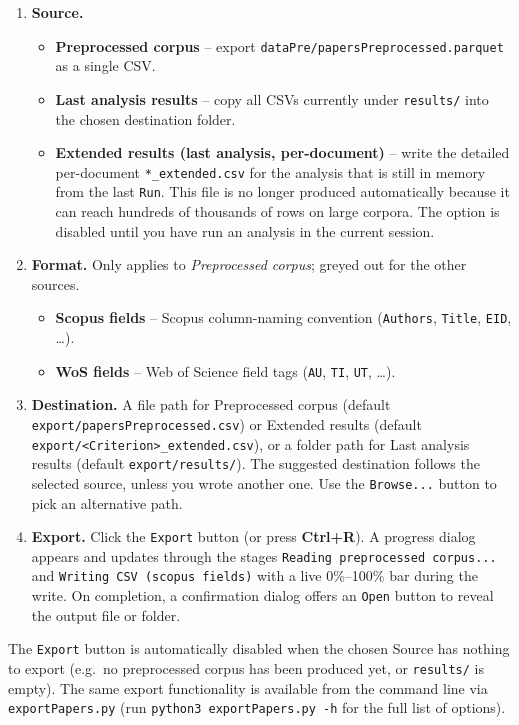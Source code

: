 \documentclass[10pt,letterpaper]{article}
\begin{document}
\begin{enumerate}
\item \textbf{Source.}
	\begin{itemize}
	\item \textbf{Preprocessed corpus} -- export \verb|dataPre/papersPreprocessed.parquet| as a single CSV.
	\item \textbf{Last analysis results} -- copy all CSVs currently under \verb|results/| into the chosen destination folder.
	\item \textbf{Extended results (last analysis, per-document)} -- write the detailed per-document \verb|*_extended.csv| for the analysis that is still in memory from the last \verb|Run|. This file is no longer produced automatically because it can reach hundreds of thousands of rows on large corpora. The option is disabled until you have run an analysis in the current session.
	\end{itemize}
\item \textbf{Format.} Only applies to \emph{Preprocessed corpus}; greyed out for the other sources.
	\begin{itemize}
	\item \textbf{Scopus fields} -- Scopus column-naming convention (\verb|Authors|, \verb|Title|, \verb|EID|, \ldots).
	\item \textbf{WoS fields} -- Web of Science field tags (\verb|AU|, \verb|TI|, \verb|UT|, \ldots).
	\end{itemize}
\item \textbf{Destination.} A file path for Preprocessed corpus (default \verb|export/papersPreprocessed.csv|) or Extended results (default \verb|export/<Criterion>_extended.csv|), or a folder path for Last analysis results (default \verb|export/results/|). The suggested destination follows the selected source, unless you wrote another one. Use the \verb|Browse...| button to pick an alternative path.
\item \textbf{Export.} Click the \verb|Export| button (or press \textbf{Ctrl+R}). A progress dialog appears and updates through the stages \verb|Reading preprocessed corpus...| and \verb|Writing CSV (scopus fields)| with a live 0\%--100\% bar during the write. On completion, a confirmation dialog offers an \verb|Open| button to reveal the output file or folder.
\end{enumerate}

The \verb|Export| button is automatically disabled when the chosen Source has nothing to export (e.g.\ no preprocessed corpus has been produced yet, or \verb|results/| is empty). The same export functionality is available from the command line via \verb|exportPapers.py| (run \verb|python3 exportPapers.py -h| for the full list of options).
\end{document}
